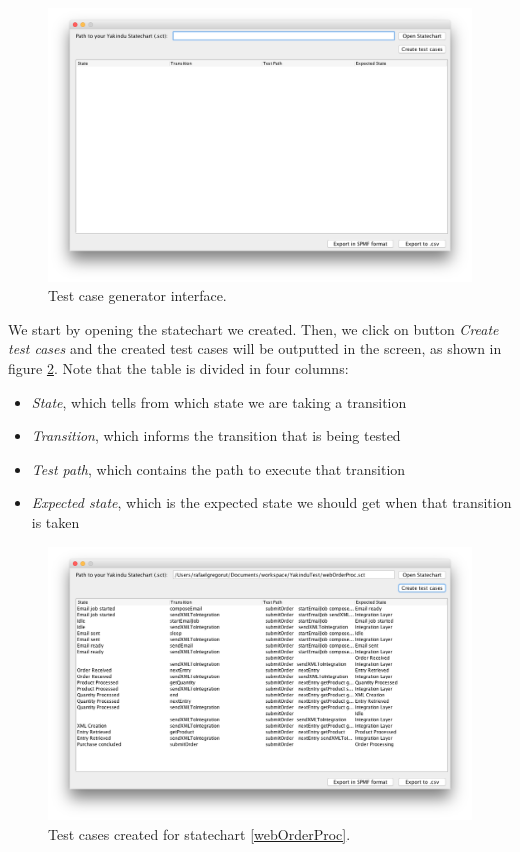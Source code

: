 \begin{figure}[htb]
\centering
\includegraphics[width=\textwidth]{figuras/testGenClean}
\caption{\label{testGenClean} Test case generator interface.}
\end{figure}

We start by opening the statechart we created. Then, we click on button \textit{Create test cases} and the created test cases will be outputted in the screen, as shown in figure \ref{testGenResults}. Note that the table is divided in four columns: 
\begin{itemize}
\item \textit{State}, which tells from which state we are taking a transition
\item \textit{Transition}, which informs the transition that is being tested 
\item \textit{Test path}, which contains the path to execute that transition
\item \textit{Expected state}, which is the expected state we should get when that transition is taken
\end{itemize}

\begin{figure}[htb]
\centering
\includegraphics[width=\textwidth]{figuras/testGenResults}
\caption{\label{testGenResults} Test cases created for statechart \ref{webOrderProc}.}
\end{figure}

